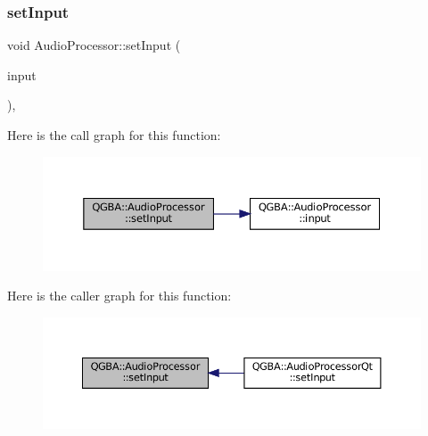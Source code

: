 \subsubsection{\texorpdfstring{set\+Input}{setInput}}
{\footnotesize\ttfamily void Audio\+Processor\+::set\+Input (\begin{DoxyParamCaption}\item[{std\+::shared\+\_\+ptr$<$ \mbox{\hyperlink{class_q_g_b_a_1_1_core_controller}{Core\+Controller}} $>$}]{input }\end{DoxyParamCaption})\hspace{0.3cm}{\ttfamily [virtual]}, {\ttfamily [slot]}}

Here is the call graph for this function\+:
\nopagebreak
\begin{figure}[H]
\begin{center}
\leavevmode
\includegraphics[width=350pt]{class_q_g_b_a_1_1_audio_processor_ab391c472b41b7e301b780e687c00ee8c_cgraph}
\end{center}
\end{figure}
Here is the caller graph for this function\+:
\nopagebreak
\begin{figure}[H]
\begin{center}
\leavevmode
\includegraphics[width=350pt]{class_q_g_b_a_1_1_audio_processor_ab391c472b41b7e301b780e687c00ee8c_icgraph}
\end{center}
\end{figure}
\mbox{\label{class_q_g_b_a_1_1_audio_processor_a213f98cc7d626a4f41522d58c14792fb}} 

